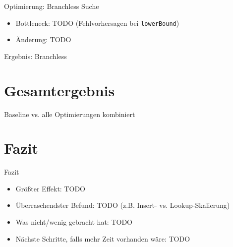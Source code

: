 \documentclass[aspectratio=169,13pt]{beamer}
\begin{document}
	
	\begin{frame}{Optimierung: Branchless Suche}
		\begin{itemize}
			\item Bottleneck: TODO (Fehlvorhersagen bei \texttt{lowerBound})
			\item Änderung: TODO
		\end{itemize}
	\end{frame}
	
	\begin{frame}{Ergebnis: Branchless}
		\centering
	\end{frame}
	
	
	\section{Gesamtergebnis}
	
	\begin{frame}{Baseline vs. alle Optimierungen kombiniert}
		\centering
	\end{frame}
	
	
	\section{Fazit}
	
	\begin{frame}{Fazit}
		\begin{itemize}
			\item Größter Effekt: TODO
			\item Überraschendster Befund: TODO (z.B. Insert- vs. Lookup-Skalierung)
			\item Was nicht/wenig gebracht hat: TODO
			\item Nächste Schritte, falls mehr Zeit vorhanden wäre: TODO
		\end{itemize}
	\end{frame}
	
\end{document}
